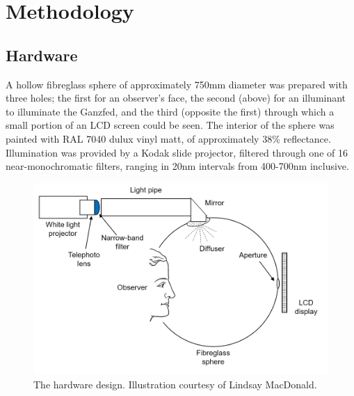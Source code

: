 \section{Methodology}

\subsection{Hardware}

A hollow fibreglass sphere of approximately 750mm diameter was prepared with three holes; the first for an observer's face, the second (above) for an illuminant to illuminate the Ganzfed, and the third (opposite the first) through which a small portion of an LCD screen could be seen. The interior of the sphere was painted with RAL 7040 dulux vinyl matt, of approximately 38\% reflectance. Illumination was provided by a Kodak slide projector, filtered through one of 16 near-monochromatic filters, ranging in 20nm intervals from 400-700nm inclusive. %

\begin{figure}[htbp]
\includegraphics[max width=\textwidth]{figs/LargeSphere/sketch.png}
\caption{The hardware design. Illustration courtesy of Lindsay MacDonald.}
\label{fig:sketch}
\end{figure}

